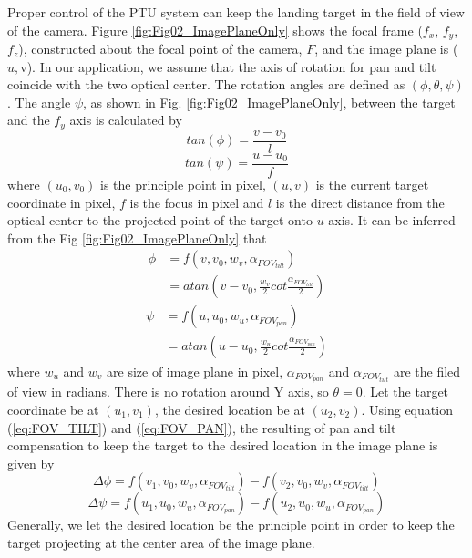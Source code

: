 Proper control of the PTU system can keep the landing target in the field of view of the camera. Figure \ref{fig:Fig02_ImagePlaneOnly} shows the focal frame ($f_x$, $f_y$, $f_z$), constructed about the focal point of the camera, $F$, and the image plane is ($u, $v).  In our application, we assume that the axis of rotation for pan and tilt coincide with the two optical center. The rotation angles are defined as $(\phi, \theta, \psi)$. The angle $\psi$, as shown in Fig. \ref{fig:Fig02_ImagePlaneOnly}, between the target and the $f_y$ axis is calculated by
\begin{equation}
	tan(\phi)=\frac{v-v_0}{l}
\end{equation}
\begin{equation}
	tan(\psi)=\frac{u-u_0}{f}
\end{equation}
where $(u_0, v_0)$ is the principle point in pixel, $(u, v)$ is the current target coordinate in pixel, $f$ is the focus in pixel and $l$ is the direct distance from the optical center to the projected point of the target onto $u$ axis. It can be inferred from the Fig \ref{fig:Fig02_ImagePlaneOnly} that
\begin{align} \label{eq:FOV_TILT}
	\phi &=f(v, v_0, w_v, \alpha_{FOV_{tilt}}) \\
	&=atan(v-v_0, \frac{w_v}{2}cot \frac{\alpha_{FOV_{tilt}}}{2})
\end{align}
\begin{align} \label{eq:FOV_PAN}
	\psi &=f(u, u_0, w_u, \alpha_{FOV_{pan}}) \\
	&=atan(u-u_0, \frac{w_u}{2}cot\frac{\alpha_{FOV_{pan}}}{2})
\end{align}
where $w_u$ and $w_v$ are size of image plane in pixel, $\alpha_{FOV_{pan}}$ and $\alpha_{FOV_{tilt}}$ are the filed of view in radians. There is no rotation around Y axis, so $\theta = 0$. Let the target coordinate be at $(u_1, v_1)$, the desired location be at $(u_2, v_2)$. Using equation (\ref{eq:FOV_TILT}) and (\ref{eq:FOV_PAN}), the resulting of pan and tilt compensation to keep the target to the desired location in the image plane is given by
\begin{equation}
	\Delta\phi=f(v_1,v_0,w_v, \alpha_{FOV_{tilt}})-f(v_2,v_0, w_v, \alpha_{FOV_{tilt}})
\end{equation}
\begin{equation}
	\Delta\psi=f(u_1,u_0,w_u, \alpha_{FOV_{pan}})-f(u_2,u_0, w_u, \alpha_{FOV_{pan}})
\end{equation}
Generally, we let the desired location be the principle point in order to keep the target projecting at the center area of the image plane.

